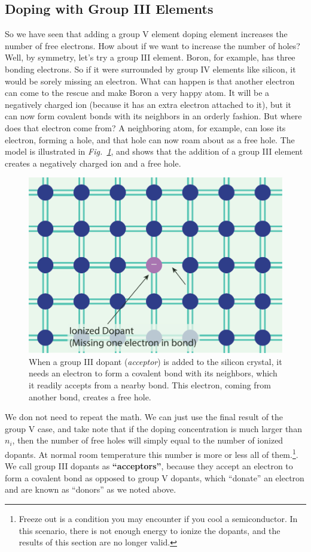 \subsection{Doping with Group III Elements}
So we have seen that adding a group V element doping element increases the number of free electrons.  How about if we want to increase the number of holes?  Well, by symmetry, let’s try a group III element.  Boron, for example, has three bonding electrons. So if it were surrounded by group IV elements like silicon, it would be sorely missing an electron.  What can happen is that another electron can come to the rescue and make Boron a very happy atom. It will be a negatively charged ion (because it has an extra electron attached to it), but it can now form covalent bonds with its neighbors in an orderly fashion.  But where does that electron come from?  A neighboring atom, for example, can lose its electron, forming a hole, and that hole can now roam about as a free hole.  The model is illustrated in \emph{Fig.~\ref{fig:silicon_dopant_III}}, and shows that the addition of a group III element creates a negatively charged ion and a free hole.
\begin{figure}[tb]
\centering
\includegraphics[width=.5\columnwidth]{silicon_dopant_III}
\caption{When a group III dopant (\emph{acceptor}) is added to the silicon crystal, it needs an electron to form a covalent bond with its neighbors, which it readily accepts from a nearby bond.  This electron, coming from another bond, creates a free hole.}
\label{fig:silicon_dopant_III}
\end{figure}

We don not need to repeat the math.  We can just use the final result of the group V case, and take note that if the doping concentration is much larger than $n_i$, then the number of free holes will simply equal to the number of ionized dopants.  At normal room temperature this number is more or less all of them.\footnote{Freeze out is a condition you may encounter if you cool a semiconductor.  In this scenario, there is not enough energy to ionize the dopants, and the results of this section are no longer valid.}. We call group III dopants as \textbf{“acceptors”}, because they accept an electron to form a covalent bond as opposed to group V dopants, which “donate” an electron and are known as “donors” as we noted above.
